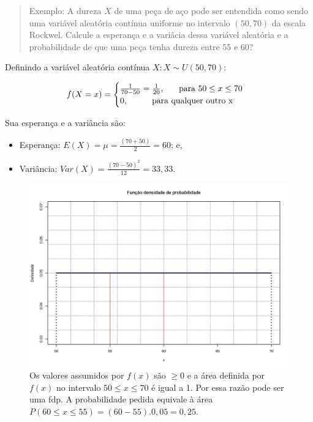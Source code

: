 \documentclass[
]{book}
\providecommand{\tightlist}{%
  \setlength{\itemsep}{0pt}\setlength{\parskip}{0pt}}
\begin{document}
\begin{quote}
Exemplo: A dureza \(X\) de uma peça de aço pode ser entendida como sendo uma variável aleatória contínua uniforme no intervalo \((50,70)\) da escala Rockwel. Calcule a esperança e a variâcia dessa variável aleatória e a probabilidade de que uma peça tenha dureza entre 55 e 60?
\end{quote}

\hfill\break

Definindo a variável aleatória contínua \(X:X \sim U(50,70)\):

\hfill\break

\[
f(X=x)=
\begin{cases}
\frac{1}{70-50}=\frac{1}{20}, \hspace{0.6cm} \text{para } 50 \le x \le 70 \\
0, \hspace{1cm} \text{para qualquer outro x}\\
\end{cases}
\]

\hfill\break

Sua esperança e a variância são:

\hfill\break

\begin{itemize}
\tightlist
\item
  Esperança: \(E(X) = \mu = \frac{(70+50)}{2}=60\); e,\\
\item
  Variância: \(Var(X) = \frac{(70-50)^{2} }{12}=33,33\).
\end{itemize}

\hfill\break

\begin{figure}

{\centering \includegraphics[width=0.6\linewidth]{images6/exerc_15} 

}

\caption{Os valores assumidos por $f(x)$ são $\ge 0$ e a área definida por $f(x)$ no intervalo $50 \le x \le 70$ é igual a 1. Por essa razão pode ser uma fdp. A probabilidade pedida equivale à área $P(60 \le x \le 55) = (60-55) .  0,05=0,25$.}\label{fig:fig22}
\end{figure}
\end{document}

